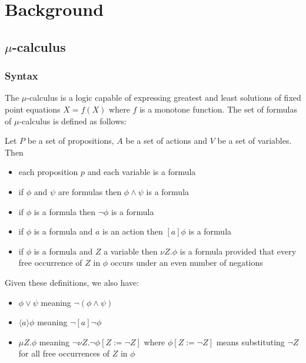 \chapter{Background}

\section{$\mu$-calculus}

\subsection{Syntax}


The $\mu$-calculus is a logic capable of expressing greatest and least solutions of fixed point equations $X = f(X)$ where $f$ is a monotone function. The set of formulas of $\mu$-calculus is defined as follows:

Let $P$ be a set of propositions, $A$ be a set of actions and $V$ be a set of variables. Then
\begin{itemize}
    \item each proposition $p$ and each variable is a formula
    \item if $\phi$ and $\psi$ are formulas then $\phi \wedge \psi$ is a formula
    \item if $\phi$ is a formula then $\neg \phi$ is a formula
    \item if $\phi$ is a formula and $a$ is an action then $[a]\phi$ is a formula
    \item if $\phi$ is a formula and $Z$ a variable then $\nu Z.\phi$ is a formula provided that every free occurrence of $Z$ in $\phi$ occurs under an even number of negations
\end{itemize}

\noindent Given these definitions, we also have:
\begin{itemize}
    \item $\phi \vee \psi$ meaning $\neg (\phi \wedge \psi)$
    \item $\langle a \rangle \phi$ meaning $\neg [a] \neg \phi$
\item $\mu Z. \phi$ meaning $\neg \nu Z. \neg \phi [Z := \neg Z]$ where $\phi[Z := \neg Z]$ means substituting $\neg Z$ for all free occurrences of $Z$ in $\phi$
\end{itemize}

